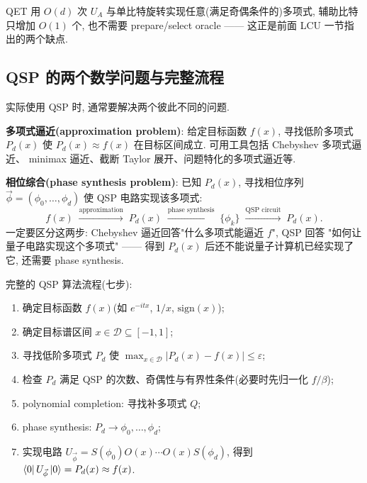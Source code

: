 \documentclass[utf8]{article} %
\numberwithin{equation}{section}   %
\newtheorem{Note}{\hskip 2em {\color{red} 注}}[subsection]
\begin{document}
\begin{Note}
    QET 用 $O(d)$ 次 $U_A$ 与单比特旋转实现任意(满足奇偶条件的)多项式,
    辅助比特只增加 $O(1)$ 个, 也不需要 prepare/select oracle ——
    这正是前面 LCU 一节指出的两个缺点.
\end{Note}

\subsection{QSP 的两个数学问题与完整流程}

实际使用 QSP 时, 通常要解决两个彼此不同的问题.

\textbf{多项式逼近(approximation problem)}: 给定目标函数 $f(x)$, 寻找低阶多项式
$P_d(x)$ 使 $P_d(x) \approx f(x)$ 在目标区间成立. 可用工具包括 Chebyshev 多项式逼近、
minimax 逼近、截断 Taylor 展开、问题特化的多项式逼近等.

\textbf{相位综合(phase synthesis problem)}: 已知 $P_d(x)$, 寻找相位序列
$\vec\phi = (\phi_0, \dots, \phi_d)$ 使 QSP 电路实现该多项式:
\begin{equation}
    f(x) \;\xrightarrow{\text{approximation}}\; P_d(x)
    \;\xrightarrow{\text{phase synthesis}}\; \{\phi_k\}
    \;\xrightarrow{\text{QSP circuit}}\; P_d(x).
\end{equation}
一定要区分这两步: Chebyshev 逼近回答"什么多项式能逼近 $f$", QSP 回答
"如何让量子电路实现这个多项式" —— 得到 $P_d(x)$ 后还不能说量子计算机已经实现了它,
还需要 phase synthesis.

完整的 QSP 算法流程(七步):
\begin{enumerate}
    \item 确定目标函数 $f(x)$(如 $e^{-itx}$, $1/x$, $\mathrm{sign}(x)$);
    \item 确定目标谱区间 $x \in \mathcal{D} \subseteq [-1,1]$;
    \item 寻找低阶多项式 $P_d$ 使 $\max_{x \in \mathcal{D}} |P_d(x) - f(x)| \le \varepsilon$;
    \item 检查 $P_d$ 满足 QSP 的次数、奇偶性与有界性条件(必要时先归一化 $f/\beta$);
    \item polynomial completion: 寻找补多项式 $Q$;
    \item phase synthesis: $P_d \to \phi_0, \dots, \phi_d$;
    \item 实现电路 $U_{\vec\phi} = S(\phi_0)O(x) \cdots O(x)S(\phi_d)$, 得到
    $\bra{0}U_{\vec\phi}\ket{0} = P_d(x) \approx f(x)$.
\end{enumerate}
\end{document}
